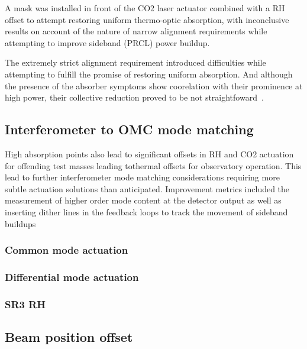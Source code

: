 A mask was installed in front of the CO2 laser actuator combined with a RH offset to attempt restoring uniform thermo-optic absorption, with inconclusive results on account of the nature of narrow alignment requirements while attempting to improve sideband (PRCL) power buildup. 

The extremely strict alignment requirement introduced difficulties while attempting to fulfill the promise of restoring uniform absorption. And although the presence of the absorber symptoms show coorelation with their prominence at high power, their collective reduction proved to be not straightfoward~\cite{brooks:aigwd2019, buikema:2020}. 


\subsection{Interferometer to OMC mode matching}
High absorption points also lead to significant offsets in RH and CO2 actuation for offending test masses leading tothermal offsets for observatory operation. This lead to further interferometer mode matching considerations requiring more subtle actuation solutions than anticipated. Improvement metrics included the measurement of higher order mode content at the detector output as well as inserting dither lines in the feedback loops to track the movement of sideband buildups

\subsubsection{Common mode actuation}

\subsubsection{Differential mode actuation}

\subsubsection{SR3 RH}

\subsection{Beam position offset}



